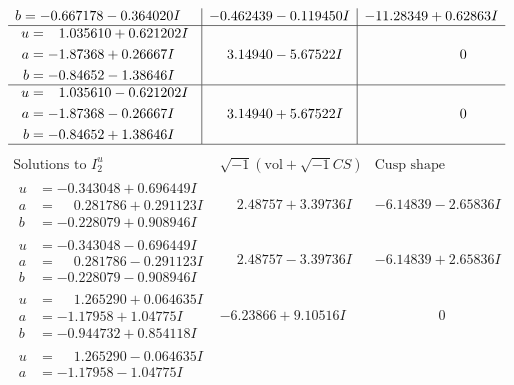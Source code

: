\documentclass[1p]{elsarticle_modified}
\theoremstyle{definition}
\newcommand{\I}{\sqrt{-1}}
\begin{document}
$$\begin{array}{c|c|c}
\begin{aligned}
b &= -0.667178 - 0.364020 I\end{aligned}
 & -0.462439 - 0.119450 I & -11.28349 + 0.62863 I \\ \hline\begin{aligned}
u &= \phantom{-}1.035610 + 0.621202 I \\
a &= -1.87368 + 0.26667 I \\
b &= -0.84652 - 1.38646 I\end{aligned}
 & \phantom{-}3.14940 - 5.67522 I & \phantom{-0.000000 } 0 \\ \hline\begin{aligned}
u &= \phantom{-}1.035610 - 0.621202 I \\
a &= -1.87368 - 0.26667 I \\
b &= -0.84652 + 1.38646 I\end{aligned}
 & \phantom{-}3.14940 + 5.67522 I & \phantom{-0.000000 } 0\\
 \hline 
 \end{array}$$\newpage$$\begin{array}{c|c|c}  
\text{Solutions to }I^u_{2}& \I (\text{vol} + \sqrt{-1}CS) & \text{Cusp shape}\\
 \hline 
\begin{aligned}
u &= -0.343048 + 0.696449 I \\
a &= \phantom{-}0.281786 + 0.291123 I \\
b &= -0.228079 + 0.908946 I\end{aligned}
 & \phantom{-}2.48757 + 3.39736 I & -6.14839 - 2.65836 I \\ \hline\begin{aligned}
u &= -0.343048 - 0.696449 I \\
a &= \phantom{-}0.281786 - 0.291123 I \\
b &= -0.228079 - 0.908946 I\end{aligned}
 & \phantom{-}2.48757 - 3.39736 I & -6.14839 + 2.65836 I \\ \hline\begin{aligned}
u &= \phantom{-}1.265290 + 0.064635 I \\
a &= -1.17958 + 1.04775 I \\
b &= -0.944732 + 0.854118 I\end{aligned}
 & -6.23866 + 9.10516 I & \phantom{-0.000000 } 0 \\ \hline\begin{aligned}
u &= \phantom{-}1.265290 - 0.064635 I \\
a &= -1.17958 - 1.04775 I \\

\end{aligned}
\end{array}$$
\end{document}
